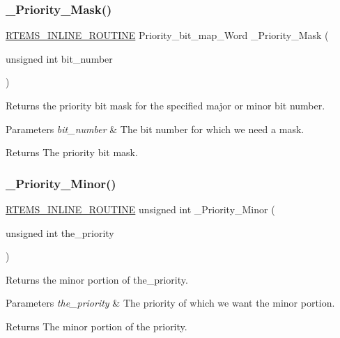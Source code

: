 \subsubsection{\texorpdfstring{\_Priority\_Mask()}{\_Priority\_Mask()}}
{\footnotesize\ttfamily \mbox{\hyperlink{group__RTEMSScoreBaseDefs_gac216239df231d5dbd15e3520b0b9313f}{R\+T\+E\+M\+S\+\_\+\+I\+N\+L\+I\+N\+E\+\_\+\+R\+O\+U\+T\+I\+NE}} Priority\+\_\+bit\+\_\+map\+\_\+\+Word \+\_\+\+Priority\+\_\+\+Mask (\begin{DoxyParamCaption}\item[{unsigned int}]{bit\+\_\+number }\end{DoxyParamCaption})}



Returns the priority bit mask for the specified major or minor bit number. 


\begin{DoxyParams}{Parameters}
{\em bit\+\_\+number} & The bit number for which we need a mask.\\
\hline
\end{DoxyParams}
\begin{DoxyReturn}{Returns}
The priority bit mask. 
\end{DoxyReturn}
\mbox{\label{group__RTEMSScorePriority_gaaf7dd3dde9aa776f2c16fee4c1e572ed}} 
\subsubsection{\texorpdfstring{\_Priority\_Minor()}{\_Priority\_Minor()}}
{\footnotesize\ttfamily \mbox{\hyperlink{group__RTEMSScoreBaseDefs_gac216239df231d5dbd15e3520b0b9313f}{R\+T\+E\+M\+S\+\_\+\+I\+N\+L\+I\+N\+E\+\_\+\+R\+O\+U\+T\+I\+NE}} unsigned int \+\_\+\+Priority\+\_\+\+Minor (\begin{DoxyParamCaption}\item[{unsigned int}]{the\+\_\+priority }\end{DoxyParamCaption})}



Returns the minor portion of the\+\_\+priority. 


\begin{DoxyParams}{Parameters}
{\em the\+\_\+priority} & The priority of which we want the minor portion.\\
\hline
\end{DoxyParams}
\begin{DoxyReturn}{Returns}
The minor portion of the priority. 
\end{DoxyReturn}
\mbox{\label{group__RTEMSScorePriority_ga10c99a53ad7cb8f77e5de8aa06deb934}} 
